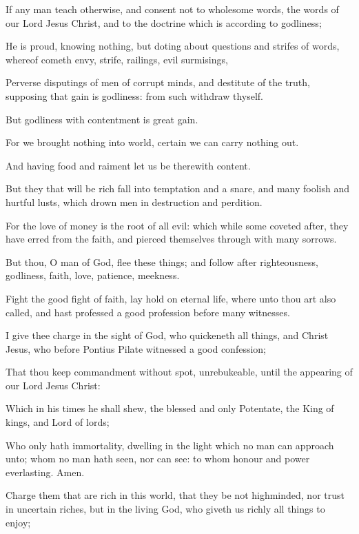{\par }{\PP {}If any
man teach
otherwise,
and
consent
not to
wholesome
words,
{}
the words of
our
Lord
Jesus
Christ,
and to the
doctrine which is according
to
godliness;

He is
proud,
knowing
nothing,
but
doting
about
questions
and strifes of
words,
whereof
cometh
envy,
strife,
railings,
evil
surmisings,

Perverse
disputings of
men of
corrupt
minds,
and
destitute of the
truth, supposing
that
gain
is
godliness:
from
such withdraw
thyself.

But
godliness
with
contentment
is
great
gain.

For we
brought
nothing
into
{}
world,
{}
certain we
can
carry
nothing
out.

And
having
food
and
raiment let us
be
therewith
content.

But they that
will be
rich
fall
into
temptation
and a
snare,
and
{}
many
foolish
and
hurtful
lusts,
which
drown
men
in
destruction
and
perdition.

For the love of
money
is the
root of
all
evil:
which
while
some coveted
after, they have
erred
from the
faith,
and
pierced
themselves
through with
many
sorrows.

But
thou,
O
man of
God,
flee these
things;
and follow
after
righteousness,
godliness,
faith,
love,
patience,
meekness.

Fight the
good
fight of
faith, lay hold
on
eternal
life,
where
unto thou
art
also
called,
and hast
professed a
good
profession
before
many
witnesses.

I
give
thee
charge in the sight
of
God, who
quickeneth all
things,
and
{}
Christ
Jesus,
who
before
Pontius
Pilate
witnessed a
good
confession;

That
thou
keep
{}
commandment without
spot,
unrebukeable,
until the
appearing of
our
Lord
Jesus
Christ:

Which in
his
times he shall
shew,
{} the
blessed
and
only
Potentate, the
King of
kings,
and
Lord of
lords;

Who
only
hath
immortality, dwelling
in the
light which no man can approach
unto;
whom
no
man hath
seen,
nor
can
see: to
whom
{}
honour
and
power
everlasting.
Amen.

Charge them that are
rich
in
this
world, that they
be
not
highminded,
nor
trust
in
uncertain
riches,
but
in the
living
God, who
giveth
us
richly all
things
to enjoy;

}
